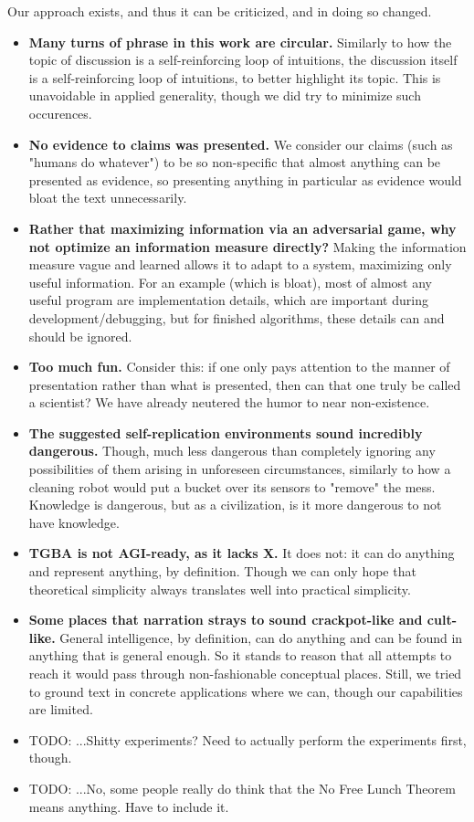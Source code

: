 \documentclass{article}
\begin{document}
Our approach exists, and thus it can be criticized, and in doing so changed.

\begin{itemize}
\item \textbf{Many turns of phrase in this work are circular.} Similarly to how the topic of discussion is a self-reinforcing loop of intuitions, the discussion itself is a self-reinforcing loop of intuitions, to better highlight its topic. This is unavoidable in applied generality, though we did try to minimize such occurences.
\item \textbf{No evidence to claims was presented.} We consider our claims (such as "humans do whatever") to be so non-specific that almost anything can be presented as evidence, so presenting anything in particular as evidence would bloat the text unnecessarily.
\item \textbf{Rather that maximizing information via an adversarial game, why not optimize an information measure directly?} Making the information measure vague and learned allows it to adapt to a system, maximizing only useful information. For an example (which is bloat), most of almost any useful program are implementation details, which are important during development/debugging, but for finished algorithms, these details can and should be ignored.
\item \textbf{Too much fun.} Consider this: if one only pays attention to the manner of presentation rather than what is presented, then can that one truly be called a scientist? We have already neutered the humor to near non-existence.
\item \textbf{The suggested self-replication environments sound incredibly dangerous.} Though, much less dangerous than completely ignoring any possibilities of them arising in unforeseen circumstances, similarly to how a cleaning robot would put a bucket over its sensors to "remove" the mess. Knowledge is dangerous, but as a civilization, is it more dangerous to not have knowledge.
\item \textbf{TGBA is not AGI-ready, as it lacks X.} It does not: it can do anything and represent anything, by definition. Though we can only hope that theoretical simplicity always translates well into practical simplicity.
\item \textbf{Some places that narration strays to sound crackpot-like and cult-like.} General intelligence, by definition, can do anything and can be found in anything that is general enough. So it stands to reason that all attempts to reach it would pass through non-fashionable conceptual places. Still, we tried to ground text in concrete applications where we can, though our capabilities are limited.
\item TODO: ...Shitty experiments? Need to actually perform the experiments first, though.
\item TODO: ...No, some people really do think that the No Free Lunch Theorem means anything. Have to include it.
\end{itemize}
\end{document}

